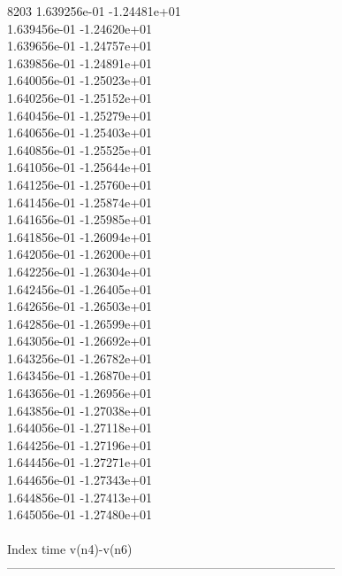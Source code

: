 8203	1.639256e-01	-1.24481e+01	\\ 	1.639456e-01	-1.24620e+01	\\ 	1.639656e-01	-1.24757e+01	\\ 	1.639856e-01	-1.24891e+01	\\ 	1.640056e-01	-1.25023e+01	\\ 	1.640256e-01	-1.25152e+01	\\ 	1.640456e-01	-1.25279e+01	\\ 	1.640656e-01	-1.25403e+01	\\ 	1.640856e-01	-1.25525e+01	\\ 	1.641056e-01	-1.25644e+01	\\ 	1.641256e-01	-1.25760e+01	\\ 	1.641456e-01	-1.25874e+01	\\ 	1.641656e-01	-1.25985e+01	\\ 	1.641856e-01	-1.26094e+01	\\ 	1.642056e-01	-1.26200e+01	\\ 	1.642256e-01	-1.26304e+01	\\ 	1.642456e-01	-1.26405e+01	\\ 	1.642656e-01	-1.26503e+01	\\ 	1.642856e-01	-1.26599e+01	\\ 	1.643056e-01	-1.26692e+01	\\ 	1.643256e-01	-1.26782e+01	\\ 	1.643456e-01	-1.26870e+01	\\ 	1.643656e-01	-1.26956e+01	\\ 	1.643856e-01	-1.27038e+01	\\ 	1.644056e-01	-1.27118e+01	\\ 	1.644256e-01	-1.27196e+01	\\ 	1.644456e-01	-1.27271e+01	\\ 	1.644656e-01	-1.27343e+01	\\ 	1.644856e-01	-1.27413e+01	\\ 	1.645056e-01	-1.27480e+01	\\ \hline
\\ \hline
Index   time            v(n4)-v(n6)     \\ \hline
--------------------------------------------------------------------------------\\ \hline
